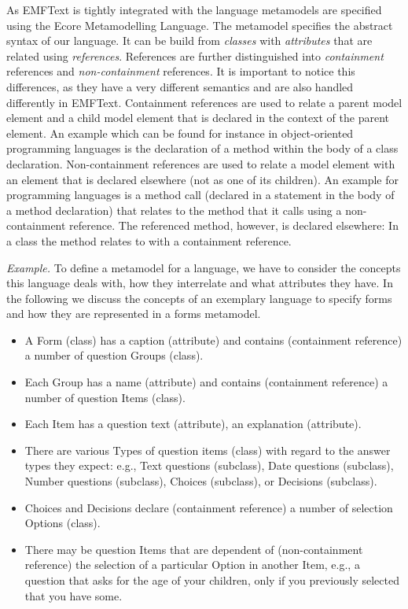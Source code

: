 	As EMFText is tightly integrated with the \EMF language metamodels are
	specified using the Ecore Metamodelling Language. The metamodel specifies the abstract
	syntax of our language. It can be build from \emph{classes} with
	\emph{attributes} that are related using \emph{references}. References are
	further distinguished into \emph{containment} references and
	\emph{non-containment} references. It is important to notice this differences,
	as they have a very different semantics and are also handled differently in
	EMFText. Containment references are used to relate a parent model element and a
	child model element that is declared in the context of the parent element. An
	example which can be found for instance in object-oriented programming
	languages is the declaration of a method within the body of a class declaration. Non-containment
	references are used to relate a model element with an element that is declared
	elsewhere (not as one of its children). An example for programming languages is
	a method call (declared in a statement in the body of a method declaration) that
	relates to the method that it calls using a non-containment reference. The
	referenced method, however, is declared elsewhere: In a class the method
	relates to with a containment reference. 

		\emph{Example.} 
		To define a metamodel for a language, we have to consider the
		concepts this language deals with, how they interrelate and what attributes they
		have. In the following we discuss the concepts of an exemplary language to
		specify forms and how they are represented in a forms metamodel.
		
		\begin{itemize} 
		  \item A Form (class) has a caption (attribute) and contains (containment
		  reference) a number of question Groups (class).
		  \item Each Group has a name (attribute) and contains (containment reference)
		  a number of question Items (class).
		  \item Each Item has a question text (attribute), an explanation
		  (attribute).
		  \item There are various Types of question items (class)  with
		  regard to the answer types they expect: e.g., Text questions
		  (subclass), Date questions  (subclass), Number questions  (subclass),
		  Choices (subclass), or Decisions (subclass).
		  \item Choices and Decisions declare (containment reference) a number of
		  selection Options (class).
		  \item There may be question Items
		  that are dependent of (non-containment reference) the selection of a 
		  particular Option in another Item, 
		  e.g., a question that asks for the age of your children, only if you
		  previously selected that you have some.
		\end{itemize}

